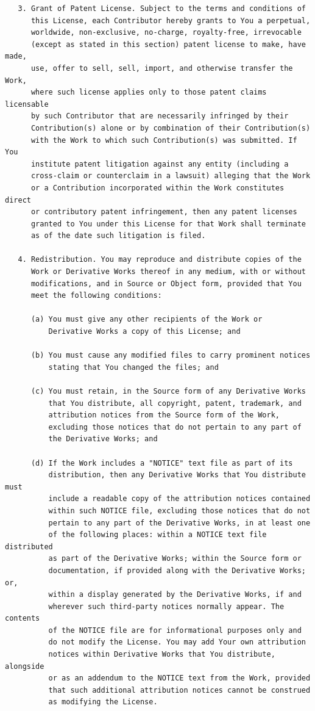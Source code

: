\documentclass{book}
\begin{document}
\begin{verbatim}
   3. Grant of Patent License. Subject to the terms and conditions of
      this License, each Contributor hereby grants to You a perpetual,
      worldwide, non-exclusive, no-charge, royalty-free, irrevocable
      (except as stated in this section) patent license to make, have made,
      use, offer to sell, sell, import, and otherwise transfer the Work,
      where such license applies only to those patent claims licensable
      by such Contributor that are necessarily infringed by their
      Contribution(s) alone or by combination of their Contribution(s)
      with the Work to which such Contribution(s) was submitted. If You
      institute patent litigation against any entity (including a
      cross-claim or counterclaim in a lawsuit) alleging that the Work
      or a Contribution incorporated within the Work constitutes direct
      or contributory patent infringement, then any patent licenses
      granted to You under this License for that Work shall terminate
      as of the date such litigation is filed.

   4. Redistribution. You may reproduce and distribute copies of the
      Work or Derivative Works thereof in any medium, with or without
      modifications, and in Source or Object form, provided that You
      meet the following conditions:

      (a) You must give any other recipients of the Work or
          Derivative Works a copy of this License; and

      (b) You must cause any modified files to carry prominent notices
          stating that You changed the files; and

      (c) You must retain, in the Source form of any Derivative Works
          that You distribute, all copyright, patent, trademark, and
          attribution notices from the Source form of the Work,
          excluding those notices that do not pertain to any part of
          the Derivative Works; and

      (d) If the Work includes a "NOTICE" text file as part of its
          distribution, then any Derivative Works that You distribute must
          include a readable copy of the attribution notices contained
          within such NOTICE file, excluding those notices that do not
          pertain to any part of the Derivative Works, in at least one
          of the following places: within a NOTICE text file distributed
          as part of the Derivative Works; within the Source form or
          documentation, if provided along with the Derivative Works; or,
          within a display generated by the Derivative Works, if and
          wherever such third-party notices normally appear. The contents
          of the NOTICE file are for informational purposes only and
          do not modify the License. You may add Your own attribution
          notices within Derivative Works that You distribute, alongside
          or as an addendum to the NOTICE text from the Work, provided
          that such additional attribution notices cannot be construed
          as modifying the License.


\end{verbatim}
\end{document}
